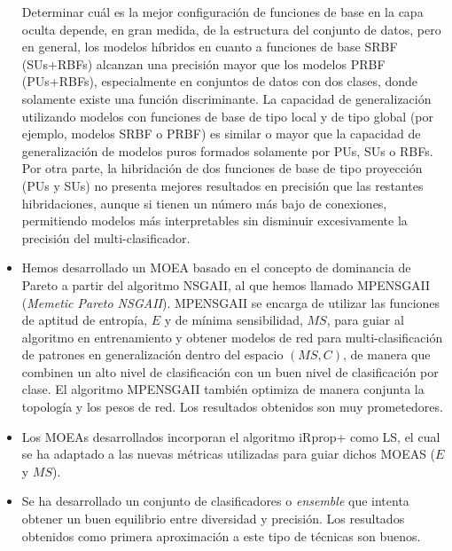 \begin{itemize}
	Determinar cuál es la mejor configuración de funciones de base en la capa oculta depende, en gran
	medida, de la estructura del conjunto de	datos, pero en general, los modelos híbridos en
	cuanto a funciones de base SRBF (SUs+RBFs)	alcanzan una precisión mayor que los modelos 	PRBF
	(PUs+RBFs), especialmente en conjuntos de datos
	con dos clases, donde solamente existe	una función discriminante. La capacidad de generalización
	utilizando modelos con funciones	de base de tipo local y de tipo global (por ejemplo, modelos
	SRBF o PRBF) es similar o mayor que la capacidad de generalización de modelos puros formados
	solamente por PUs, SUs o RBFs. Por otra parte, la hibridación	de dos funciones de base de tipo
	proyección (PUs y SUs) no presenta	mejores resultados en precisión que las restantes
	hibridaciones, aunque si tienen un	número más bajo de conexiones, permitiendo modelos más
	interpretables sin disminuir excesivamente la precisión del multi-clasificador.

	\item Hemos desarrollado un MOEA basado en el concepto de dominancia de Pareto a partir del
	algoritmo NSGAII, al que hemos llamado MPENSGAII (\textit{Memetic Pareto NSGAII}). MPENSGAII
	se encarga de utilizar las funciones de aptitud de entropía, $E$ y de mínima
	sensibilidad, $MS$, para guiar al
   algoritmo en entrenamiento y obtener  modelos de red para multi-clasificación de
	patrones en generalización dentro del espacio $(MS,C)$, de manera que combinen
	un alto nivel  de clasificación con un buen nivel de clasificación por clase. El
	algoritmo MPENSGAII también optimiza de manera conjunta la topología y los pesos de red. Los
	resultados obtenidos son muy prometedores.

	\item Los MOEAs desarrollados incorporan el algoritmo iRprop+ como LS, el
	cual se ha adaptado a las nuevas métricas utilizadas para guiar dichos MOEAS ($E$ y
	$MS$).

	\item Se ha desarrollado un conjunto de clasificadores o \textit{ensemble}  que intenta obtener
	un buen equilibrio entre diversidad y precisión. Los resultados obtenidos como primera
	aproximación a este tipo de técnicas son buenos.


\end{itemize}
